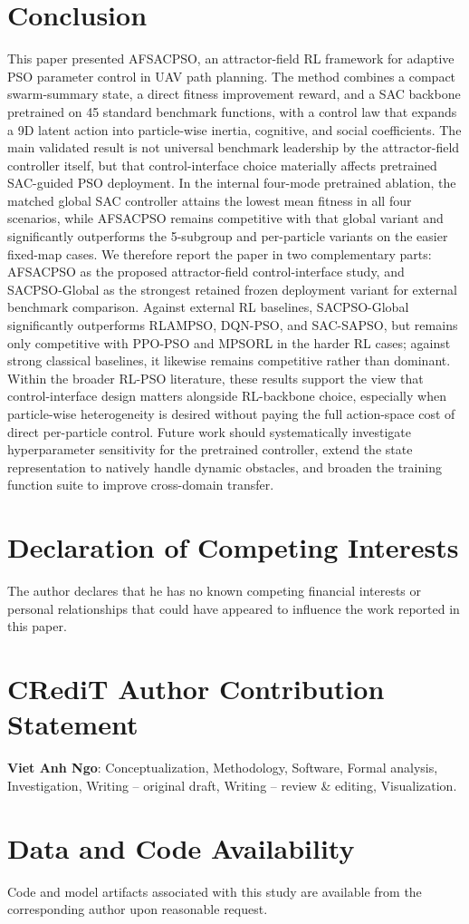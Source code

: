\documentclass[final,5p,times]{elsarticle}
\begin{document}
\section{Conclusion}
\label{sec:conclusion}
This paper presented AFSACPSO, an attractor-field RL framework for adaptive PSO parameter control in UAV path planning.
The method combines a compact swarm-summary state, a direct fitness improvement reward, and a SAC backbone pretrained on 45 standard benchmark functions, with a control law that expands a 9D latent action into particle-wise inertia, cognitive, and social coefficients.
The main validated result is not universal benchmark leadership by the attractor-field controller itself, but that control-interface choice materially affects pretrained SAC-guided PSO deployment.
In the internal four-mode pretrained ablation, the matched global SAC controller attains the lowest mean fitness in all four scenarios, while AFSACPSO remains competitive with that global variant and significantly outperforms the 5-subgroup and per-particle variants on the easier fixed-map cases.
We therefore report the paper in two complementary parts: AFSACPSO as the proposed attractor-field control-interface study, and SACPSO-Global as the strongest retained frozen deployment variant for external benchmark comparison.
Against external RL baselines, SACPSO-Global significantly outperforms RLAMPSO, DQN-PSO, and SAC-SAPSO, but remains only competitive with PPO-PSO and MPSORL in the harder RL cases; against strong classical baselines, it likewise remains competitive rather than dominant.
Within the broader RL-PSO literature, these results support the view that control-interface design matters alongside RL-backbone choice, especially when particle-wise heterogeneity is desired without paying the full action-space cost of direct per-particle control.
Future work should systematically investigate hyperparameter sensitivity for the pretrained controller, extend the state representation to natively handle dynamic obstacles, and broaden the training function suite to improve cross-domain transfer.
\section*{Declaration of Competing Interests}
The author declares that he has no known competing financial interests or personal relationships that could have appeared to influence the work reported in this paper.

\section*{CRediT Author Contribution Statement}
\textbf{Viet Anh Ngo}: Conceptualization, Methodology, Software, Formal analysis, Investigation, Writing -- original draft, Writing -- review \& editing, Visualization.

\section*{Data and Code Availability}
Code and model artifacts associated with this study are available from the corresponding author upon reasonable request.


\end{document}

